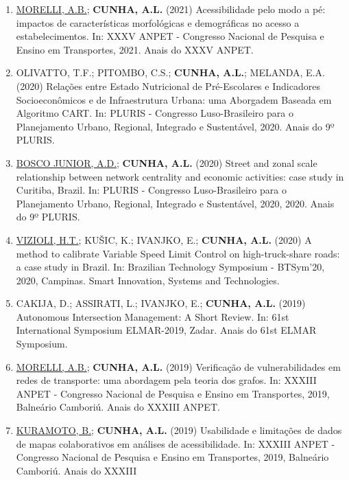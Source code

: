 \documentclass[
  brazilian,
  11pt,
  a4paper,
]{article}
\begin{document}
\begin{enumerate}
  Proposta de indicadores de potencial cicloviário pela ótica da
  acessibilidade: identificando vias mais propícias para ciclovias e
  ciclofaixas a partir de dados amplamente disponíveis. In: XXXVI ANPET
  - Congresso Nacional de Pesquisa e Ensino em Transportes, 2022,
  Fortaleza. Anais do XXXVI ANPET.
\item
  \ul{MORELLI, A.B.}; \textbf{CUNHA, A.L.} (2021) Acessibilidade pelo
  modo a pé: impactos de características morfológicas e demográficas no
  acesso a estabelecimentos. In: XXXV ANPET - Congresso Nacional de
  Pesquisa e Ensino em Transportes, 2021. Anais do XXXV ANPET.
\item
  OLIVATTO, T.F.; PITOMBO, C.S.; \textbf{CUNHA, A.L.}; MELANDA, E.A.
  (2020) Relações entre Estado Nutricional de Pré-Escolares e
  Indicadores Socioeconômicos e de Infraestrutura Urbana: uma Aborgadem
  Baseada em Algoritmo CART. In: PLURIS - Congresso Luso-Brasileiro para
  o Planejamento Urbano, Regional, Integrado e Sustentável, 2020. Anais
  do 9º PLURIS.
\item
  \ul{BOSCO JUNIOR, A.D.}; \textbf{CUNHA, A.L.} (2020) Street and zonal
  scale relationship between network centrality and economic activities:
  case study in Curitiba, Brazil. In: PLURIS - Congresso Luso-Brasileiro
  para o Planejamento Urbano, Regional, Integrado e Sustentável, 2020,
  2020. Anais do 9º PLURIS.
\item
  \ul{VIZIOLI, H.T.}; KUŠIC, K.; IVANJKO, E.; \textbf{CUNHA, A.L.}
  (2020) A method to calibrate Variable Speed Limit Control on
  high-truck-share roads: a case study in Brazil. In: Brazilian
  Technology Symposium - BTSym'20, 2020, Campinas. Smart Innovation,
  Systems and Technologies.
\item
  CAKIJA, D.; ASSIRATI, L.; IVANJKO, E.; \textbf{CUNHA, A.L.} (2019)
  Autonomous Intersection Management: A Short Review. In: 61st
  International Symposium ELMAR-2019, Zadar. Anais do 61st ELMAR
  Symposium.
\item
  \ul{MORELLI, A.B.}; \textbf{CUNHA, A.L.} (2019) Verificação de
  vulnerabilidades em redes de transporte: uma abordagem pela teoria dos
  grafos. In: XXXIII ANPET - Congresso Nacional de Pesquisa e Ensino em
  Transportes, 2019, Balneário Camboriú. Anais do XXXIII ANPET.
\item
  \ul{KURAMOTO, B.}; \textbf{CUNHA, A.L.} (2019) Usabilidade e
  limitações de dados de mapas colaborativos em análises de
  acessibilidade. In: XXXIII ANPET - Congresso Nacional de Pesquisa e
  Ensino em Transportes, 2019, Balneário Camboriú. Anais do XXXIII

\end{enumerate}
\end{document}
